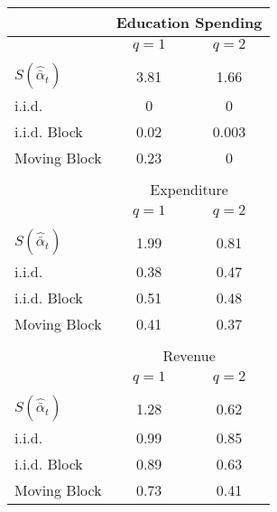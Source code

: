 \begin{tabular}{@{}lcc@{}}
	\toprule 
	& \multicolumn{2}{c}{ Education Spending } \\
\hline
	& $q=1$ & $q=2$ \\
\hline \\
	$S (\hat{\bar{\alpha}}_{t})$ & 3.81 & 1.66 \vspace{2mm}\\
	i.i.d. & 0 & 0 \\
	i.i.d. Block & 0.02 & 0.003 \\
	Moving Block & 0.23 & 0 \\
		 &  &  \\
	& \multicolumn{2}{c}{ Expenditure }\\
\hline
	& $q=1$ & $q=2$ \\
\hline \\
	$S (\hat{\bar{\alpha}}_{t})$ & 1.99 & 0.81\vspace{2mm} \\
	i.i.d. & 0.38 & 0.47 \\
	i.i.d. Block & 0.51 & 0.48 \\
	Moving Block & 0.41 & 0.37 \\
			 &  &  \\
	& \multicolumn{2}{c}{ Revenue }\\
\hline
	& $q=1$ & $q=2$ \\
\hline \\
	$S (\hat{\bar{\alpha}}_{t})$ & 1.28 & 0.62\vspace{2mm} \\
	i.i.d. & 0.99 & 0.85 \\
	i.i.d. Block & 0.89 & 0.63 \\
	Moving Block & 0.73 & 0.41 \\
\bottomrule
\end{tabular}
